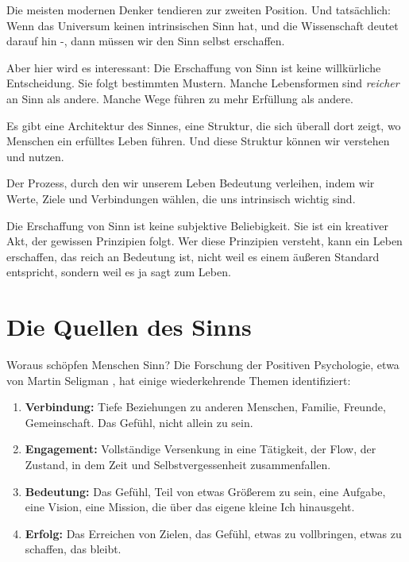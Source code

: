 Die meisten modernen Denker tendieren zur zweiten Position. Und tatsächlich: Wenn das Universum keinen intrinsischen Sinn hat, und die Wissenschaft deutet darauf hin -, dann müssen wir den Sinn selbst erschaffen.

Aber hier wird es interessant: Die Erschaffung von Sinn ist keine willkürliche Entscheidung. Sie folgt bestimmten Mustern. Manche Lebensformen sind \emph{reicher} an Sinn als andere. Manche Wege führen zu mehr Erfüllung als andere.

Es gibt eine Architektur des Sinnes, eine Struktur, die sich überall dort zeigt, wo Menschen ein erfülltes Leben führen. Und diese Struktur können wir verstehen und nutzen.

\begin{defi}
	Der Prozess, durch den wir unserem Leben Bedeutung verleihen, indem wir Werte, Ziele und Verbindungen wählen, die uns intrinsisch wichtig sind.
\end{defi}

Die Erschaffung von Sinn ist keine subjektive Beliebigkeit. Sie ist ein kreativer Akt, der gewissen Prinzipien folgt. Wer diese Prinzipien versteht, kann ein Leben erschaffen, das reich an Bedeutung ist, nicht weil es einem äußeren Standard entspricht, sondern weil es \glqq ja\grqq{} sagt zum Leben.

\section{Die Quellen des Sinns}

Woraus schöpfen Menschen Sinn? Die Forschung der Positiven Psychologie, etwa von Martin Seligman \cite{Seligman2011}, hat einige wiederkehrende Themen identifiziert:

\begin{enumerate}
	\item \textbf{Verbindung:} Tiefe Beziehungen zu anderen Menschen, Familie, Freunde, Gemeinschaft. Das Gefühl, nicht allein zu sein.
	\item \textbf{Engagement:} Vollständige Versenkung in eine Tätigkeit, der \glqq Flow\grqq{}, der Zustand, in dem Zeit und Selbstvergessenheit zusammenfallen.
	\item \textbf{Bedeutung:} Das Gefühl, Teil von etwas Größerem zu sein, eine Aufgabe, eine Vision, eine Mission, die über das eigene kleine Ich hinausgeht.
	\item \textbf{Erfolg:} Das Erreichen von Zielen, das Gefühl, etwas zu vollbringen, etwas zu schaffen, das bleibt.
\end{enumerate}

